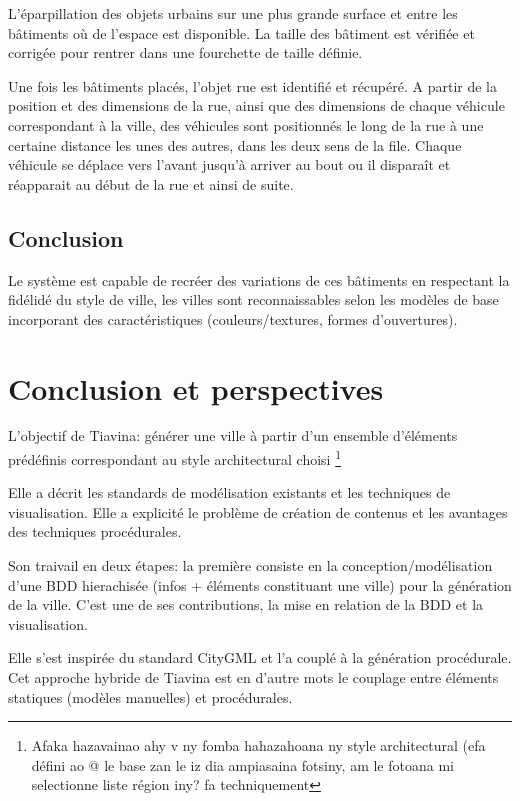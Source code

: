 \documentclass[11pt]{report}
\begin{document}
L'éparpillation des objets urbains sur une plus grande surface et entre les bâtiments où de l'espace est disponible. La taille des bâtiment est vérifiée et corrigée pour rentrer dans une fourchette de taille définie.

Une fois les bâtiments placés, l'objet rue est identifié et récupéré. A partir de la position et des dimensions de la rue, ainsi que des dimensions de chaque véhicule correspondant à la ville, des véhicules sont positionnés le long de la rue à une certaine distance les unes des autres, dans les deux sens de la file. Chaque véhicule se déplace vers l'avant jusqu'à arriver au bout ou il disparaît et réapparait au début de la rue et ainsi de suite.


\subsection{Conclusion}

Le système est capable de recréer des variations de ces bâtiments en respectant la fidélidé du style de ville, les villes sont reconnaissables selon les modèles de base incorporant des caractéristiques (couleurs/textures, formes d'ouvertures).

\section{Conclusion et perspectives}

L'objectif de Tiavina: générer une ville à partir d'un ensemble d'éléments prédéfinis correspondant au style architectural choisi \footnote{Afaka hazavainao ahy v ny fomba hahazahoana ny style architectural (efa défini ao @ le base zan le iz dia ampiasaina fotsiny, am le fotoana mi selectionne liste région iny? fa techniquement}

Elle a décrit les standards de modélisation existants et les techniques de visualisation.
Elle a explicité le problème de création de contenus et les avantages des techniques procédurales.

Son traivail en deux étapes: la première consiste en la conception/modélisation d'une BDD hierachisée (infos + éléments constituant une ville) pour la génération de la ville.
C'est une de ses contributions, la mise en relation de la BDD et la visualisation.

Elle s'est inspirée du standard CityGML et l'a couplé à la génération procédurale.
Cet approche hybride de Tiavina est en d'autre mots le couplage entre éléments statiques (modèles manuelles) et procédurales.
\end{document}
